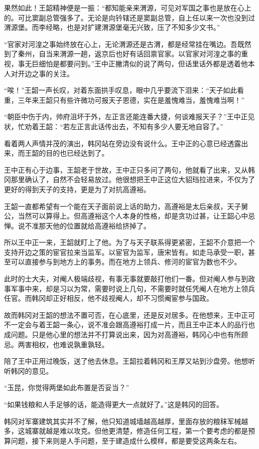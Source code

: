 果然如此！王韶精神便是一振：“都知能亲来渭源，可见对军国之事也是放在心上的。可比窦副总管强多了。无论是向钤辖还是窦副总管，自上任以来一次也没到过渭源堡。而李经略，也是对扩建渭源堡毫无兴致，压了不知多少文书。”

“官家对河湟之事始终放在心上，无论渭源还是古渭，都是经常挂在嘴边。吾既然到了秦州，自当来渭源一趟，返京后也好有话回禀官家。以官家对河湟之事的重视，事无巨细怕是都要问到。”王中正撇清似的说了两句，但话里话外都是透着他本人对开边之事的关注。

“唉！”王韶一声长叹，对着东面拱手叹息，眼中几乎要流下泪来：“天子如此看重，三年来王韶只有些许微功可报天子恩德，实在是羞愧难当，羞愧难当啊！”

“朝臣中伤于内，帅府沮坏于外，左正言还能连番大捷，何谈难报天子？”王中正见状，忙劝着王韶：“若左正言此话传出去，不知有多少人要无地自容了。”

看着两人声情并茂的演出，韩冈站在旁边没有说什么。王中正的心意已经透露出来，而王韶的目的也已经达到了。

王中正有心于边事，王韶老于世故，王中正只多问了两句，他就看了出来，又从韩冈那里确认了，自然不会轻易放过。他很想把王中正这位大貂珰拉进来，不仅为了更好的得到天子的支持，更是为了对抗高遵裕。

王韶一直都希望有一个能在天子面前说上话的助力，高遵裕是太后亲叔，天子舅公，当然可以算得上。但高遵裕这个人本身的性格，却是贪功过甚，让王韶心中忌惮。说不准那天他的位置就给高遵裕给挤掉了。

所以王中正一来，王韶就盯上了他。为了与天子联系得更紧密，王韶不介意把一个支持开边之策的宦官拉来当监军。以宦官为监军，唐宋皆有。如走马承受一职，甚至可以直接参与到地方上的事务。而在地方上领兵、修河的宦官为数也不少。

此时的士大夫，对阉人极端歧视，有事无事就要敲打他们一番。但对阉人参与到政事军事中来，却是习以为常，需要时说上几句，不需要时就任凭阉人在地方上领兵任官。而韩冈却正好相反，他不歧视阉人，却不习惯阉宦参与国政。

故而韩冈对王韶的想法不置可否，在心底里，还是反对居多。在他想来，王中正可不一定会与着王韶一条心，说不准会跟高遵裕打成一片，而且王中正本人的品行也成问题。只是他心里的想法并不打算说出来，因为对高遵裕，韩冈心中也有所顾忌。两害相权，也难说孰重孰轻。

陪了王中正用过晚饭，送了他去休息。王韶拉着韩冈和王厚又站到沙盘旁。他想听听韩冈的意见。

“玉昆，你觉得两堡如此布置是否妥当？”

“如果钱粮和人手足够的话，能造得更大一点就好了。”这是韩冈的回答。

韩冈对军寨建筑其实并不了解，他只知道城墙越高越厚，里面存放的粮秣军械越多，这城寨就越是难以攻克。但他更清楚，修造任何工程，第一个要考虑的都是预算问题，接下来则是人手问题，至于建造成什么模样，都是要受这两条左右。


